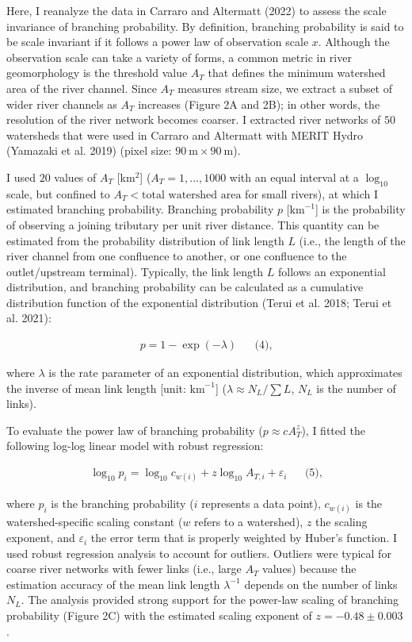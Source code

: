 \documentclass[
  12pt,
]{article}
\begin{document}
Here, I reanalyze the data in Carraro and Altermatt (2022) to assess the scale invariance of branching probability. By definition, branching probability is said to be scale invariant if it follows a power law of observation scale \(x\). Although the observation scale can take a variety of forms, a common metric in river geomorphology is the threshold value \(A_T\) that defines the minimum watershed area of the river channel. Since \(A_T\) measures stream size, we extract a subset of wider river channels as \(A_T\) increases (Figure 2A and 2B); in other words, the resolution of the river network becomes coarser. I extracted river networks of \(50\) watersheds that were used in Carraro and Altermatt with MERIT Hydro (Yamazaki et al. 2019) (pixel size: \(90~\text{m} \times 90~\text{m}\)).

I used \(20\) values of \(A_T\) {[}km\(^2\){]} (\(A_T=1,...,1000\) with an equal interval at a \(\log_{10}\) scale, but confined to \(A_T < \text{total watershed area}\) for small rivers), at which I estimated branching probability. Branching probability \(p\) {[}\(\text{km}^{-1}\){]} is the probability of observing a joining tributary per unit river distance. This quantity can be estimated from the probability distribution of link length \(L\) (i.e., the length of the river channel from one confluence to another, or one confluence to the outlet/upstream terminal). Typically, the link length \(L\) follows an exponential distribution, and branching probability can be calculated as a cumulative distribution function of the exponential distribution (Terui et al. 2018; Terui et al. 2021):

\[
\begin{aligned}
p = 1 - \exp(-\lambda)  &&\text{(4),}
\end{aligned}
\]

where \(\lambda\) is the rate parameter of an exponential distribution, which approximates the inverse of mean link length {[}unit: \(\text{km}^{-1}\){]} (\(\lambda \approx N_L / \sum L\), \(N_L\) is the number of links).

To evaluate the power law of branching probability (\(p \approx cA_T^z\)), I fitted the following log-log linear model with robust regression:

\[
\begin{aligned}
\log_{10} p_{i} = \log_{10} c_{w(i)} + z\log_{10} A_{T,i} + \varepsilon_{i}  &&\text{(5),}
\end{aligned}
\]

where \(p_i\) is the branching probability (\(i\) represents a data point), \(c_{w(i)}\) is the watershed-specific scaling constant (\(w\) refers to a watershed), \(z\) the scaling exponent, and \(\varepsilon_i\) the error term that is properly weighted by Huber's function. I used robust regression analysis to account for outliers. Outliers were typical for coarse river networks with fewer links (i.e., large \(A_T\) values) because the estimation accuracy of the mean link length \(\lambda^{-1}\) depends on the number of links \(N_L\). The analysis provided strong support for the power-law scaling of branching probability (Figure 2C) with the estimated scaling exponent of \(z = -0.48 \pm 0.003\).
\end{document}
